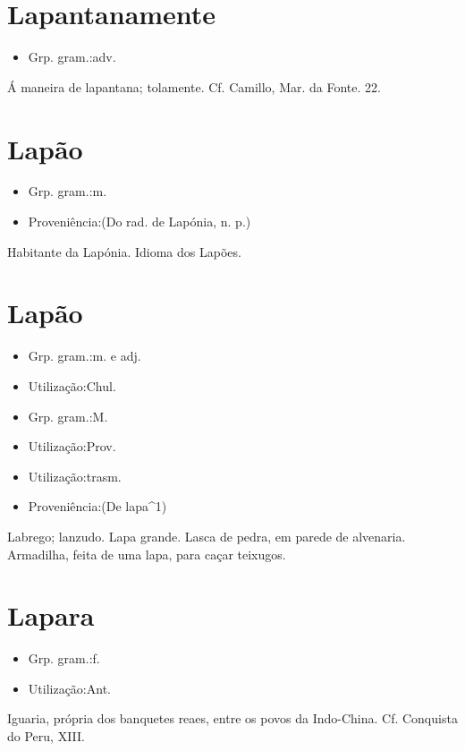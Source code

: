 \section{Lapantanamente}
\begin{itemize}
\item {Grp. gram.:adv.}
\end{itemize}
Á maneira de lapantana; tolamente. Cf. Camillo, \textunderscore Mar. da Fonte\textunderscore . 22.
\section{Lapão}
\begin{itemize}
\item {Grp. gram.:m.}
\end{itemize}
\begin{itemize}
\item {Proveniência:(Do rad. de \textunderscore Lapónia\textunderscore , n. p.)}
\end{itemize}
Habitante da Lapónia.
Idioma dos Lapões.
\section{Lapão}
\begin{itemize}
\item {Grp. gram.:m.  e  adj.}
\end{itemize}
\begin{itemize}
\item {Utilização:Chul.}
\end{itemize}
\begin{itemize}
\item {Grp. gram.:M.}
\end{itemize}
\begin{itemize}
\item {Utilização:Prov.}
\end{itemize}
\begin{itemize}
\item {Utilização:trasm.}
\end{itemize}
\begin{itemize}
\item {Proveniência:(De \textunderscore lapa\textunderscore ^1)}
\end{itemize}
Labrego; lanzudo.
Lapa grande.
Lasca de pedra, em parede de alvenaria.
Armadilha, feita de uma lapa, para caçar teixugos.
\section{Lapara}
\begin{itemize}
\item {Grp. gram.:f.}
\end{itemize}
\begin{itemize}
\item {Utilização:Ant.}
\end{itemize}
Iguaria, própria dos banquetes reaes, entre os povos da Indo-China. Cf. \textunderscore Conquista do Peru\textunderscore , XIII.
